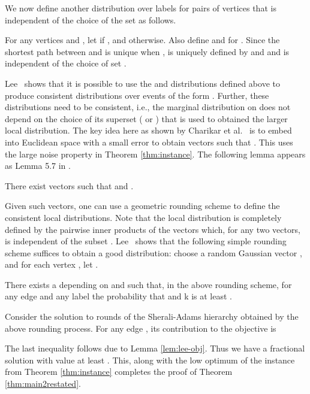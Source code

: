 \documentclass[oribibl]{llncs}
\begin{document}
We now define another distribution  over labels for pairs of
vertices that is independent of the choice of the set  as follows.
\begin{definition} For any vertices  and , let
	 if , and  otherwise. Also define  and  for . Since the shortest path between  and  is unique
	when ,  is uniquely defined by  and
	 and is independent of the choice of set .
\end{definition}
Lee~\cite{lee2014hardness} shows that it is possible to use the 
and  distributions defined above to produce consistent
distributions over events of the form . Further, these distributions
need to be consistent, i.e., the marginal distribution on 
does not depend on the choice of its superset ( or ) that is
used to obtained the larger local distribution. The key idea here as
shown by Charikar et al.~\cite{charikar2009integrality} is to embed
 into Euclidean space 
with a small error to obtain  vectors  such that . This uses the large noise property in Theorem
\ref{thm:instance}. The following lemma appears as Lemma 5.7 in
\cite{lee2014hardness}.
\begin{lemma}
There exist  vectors  such that  and .
\end{lemma}
Given such  vectors, one can use a geometric rounding scheme to
define the consistent local distributions. Note that the local
distribution is completely defined by the pairwise inner products of
the vectors which, for any two vectors, is independent of the
subset . Lee~\cite{lee2014hardness} 
shows that the
following simple rounding scheme suffices to obtain a good
distribution: choose a random Gaussian vector , and for each vertex
, let .  
\begin{lemma} \label{lem:lee-obj} There
	exists a  depending on  and  such that, in
	the above rounding scheme, for any edge  and any label
	 the probability that  and k is at least .  
\end{lemma}
	Consider the solution to  
	rounds of the Sherali-Adams hierarchy obtained by the 
	above rounding process. 
	For any edge , its contribution 
	to the objective is 
	
The last inequality follows due to  Lemma \ref{lem:lee-obj}. Thus we have 
a fractional solution with  value at least .
This, along with the low optimum of the instance from Theorem
\ref{thm:instance} completes the proof of Theorem
\ref{thm:main2restated}.
\end{document}
